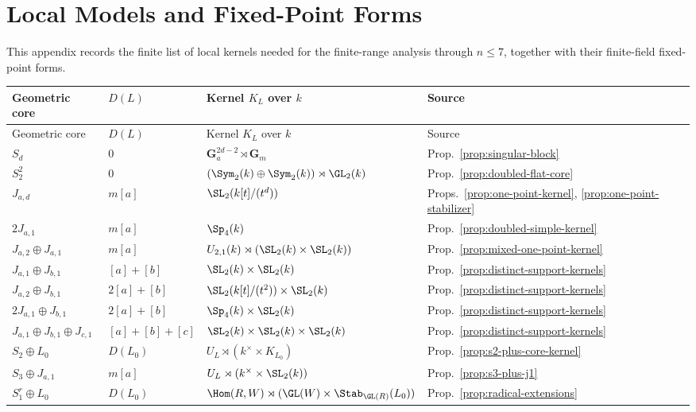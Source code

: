 \section{Local Models and Fixed-Point Forms}
\label{sec:local-models}

This appendix records the finite list of local kernels needed for the
finite-range analysis through \(n\leq 7\), together with their finite-field
fixed-point forms.

\begin{center}
\footnotesize
\setlength{\tabcolsep}{3pt}
\begin{longtable}{@{}L{0.22\textwidth} L{0.12\textwidth} L{0.38\textwidth} L{0.16\textwidth}@{}}
\toprule
Geometric core & \(D(L)\) & Kernel \(K_L\) over \(k\) & Source \\
\midrule
\endfirsthead
\toprule
Geometric core & \(D(L)\) & Kernel \(K_L\) over \(k\) & Source \\
\midrule
\endhead
\bottomrule
\endlastfoot
\(S_d\) &
\(0\) &
\(\mathbf G_a^{2d-2}\rtimes \mathbf G_m\) &
Prop.~\ref{prop:singular-block} \\
\(S_2^2\) &
\(0\) &
\((\Sym_2(k)\oplus \Sym_2(k))\rtimes \GL_2(k)\) &
Prop.~\ref{prop:doubled-flat-core} \\
\(J_{a,d}\) &
\(m[a]\) &
\(\SL_2(k[t]/(t^d))\) &
Props.~\ref{prop:one-point-kernel}, \ref{prop:one-point-stabilizer} \\
\(2J_{a,1}\) &
\(m[a]\) &
\(\Sp_4(k)\) &
Prop.~\ref{prop:doubled-simple-kernel} \\
\(J_{a,2}\oplus J_{a,1}\) &
\(m[a]\) &
\(U_{2,1}(k)\rtimes (\SL_2(k)\times \SL_2(k))\) &
Prop.~\ref{prop:mixed-one-point-kernel} \\
\(J_{a,1}\oplus J_{b,1}\) &
\([a]+[b]\) &
\(\SL_2(k)\times \SL_2(k)\) &
Prop.~\ref{prop:distinct-support-kernels} \\
\(J_{a,2}\oplus J_{b,1}\) &
\(2[a]+[b]\) &
\(\SL_2(k[t]/(t^2))\times \SL_2(k)\) &
Prop.~\ref{prop:distinct-support-kernels} \\
\(2J_{a,1}\oplus J_{b,1}\) &
\(2[a]+[b]\) &
\(\Sp_4(k)\times \SL_2(k)\) &
Prop.~\ref{prop:distinct-support-kernels} \\
\(J_{a,1}\oplus J_{b,1}\oplus J_{c,1}\) &
\([a]+[b]+[c]\) &
\(\SL_2(k)\times \SL_2(k)\times \SL_2(k)\) &
Prop.~\ref{prop:distinct-support-kernels} \\
\(S_2\oplus L_0\) &
\(D(L_0)\) &
\(U_L\rtimes (k^\times\times K_{L_0})\) &
Prop.~\ref{prop:s2-plus-core-kernel} \\
\(S_3\oplus J_{a,1}\) &
\(m[a]\) &
\(U_L\rtimes (k^\times\times \SL_2(k))\) &
Prop.~\ref{prop:s3-plus-j1} \\
\(S_1^r\oplus L_0\) &
\(D(L_0)\) &
\(\Hom(R,W)\rtimes (\GL(W)\times \Stab_{\GL(R)}(L_0))\) &
Prop.~\ref{prop:radical-extensions} \\
\end{longtable}
\setlength{\tabcolsep}{6pt}
\end{center}

